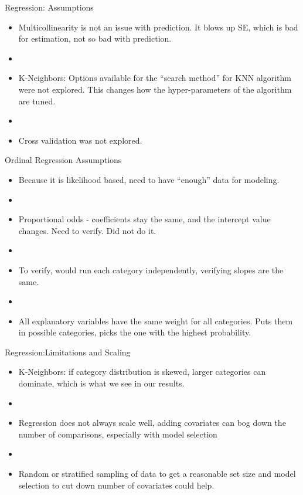 \documentclass{beamer}
\begin{document}
\begin{frame}{Regression: Assumptions}
	\begin{itemize}
	\item Multicollinearity is not an issue with prediction. It blows up SE, which is bad for estimation, not so bad with prediction.
	\item[]
	\item K-Neighbors: Options available for the ``search method'' for KNN algorithm were not explored. This changes how the hyper-parameters of the algorithm are tuned.
	\item[]
	\item Cross validation was not explored.
	\end{itemize}
\end{frame}

\begin{frame}{Ordinal Regression Assumptions}
	\begin{itemize}
	\item Because it is likelihood based, need to have ``enough'' data for modeling.
	\item[]
	\item Proportional odds - coefficients stay the same, and the intercept value changes. Need to verify. Did not do it.
	\item[]
	\item To verify, would run each category independently, verifying slopes are the same.
	\item[]
	\item All explanatory variables have the same weight for all categories. Puts them in possible categories, picks the one with the highest probability. 
	\end{itemize}
\end{frame}

\begin{frame}{Regression:Limitations and Scaling}
	\begin{itemize}
	\item K-Neighbors: if category distribution is skewed, larger categories can dominate, which is what we see in our results.
	\item[]
	\item Regression does not always scale well, adding covariates can bog down the number of comparisons, especially with model selection
	\item[]
	\item Random or stratified sampling of data to get a reasonable set size and model selection to cut down number of covariates could help.
	\end{itemize}
\end{frame}
\end{document}
